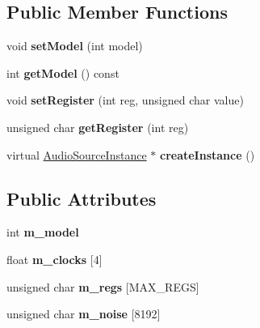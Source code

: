 \subsection*{Public Member Functions}
\begin{DoxyCompactItemize}
\item 
\mbox{\label{class_so_loud_1_1_vic_a0f50281a9b115fd11b81ee3eb700db79}} 
void {\bfseries set\+Model} (int model)
\item 
\mbox{\label{class_so_loud_1_1_vic_ad2c81766e3858af1800de741002ae928}} 
int {\bfseries get\+Model} () const
\item 
\mbox{\label{class_so_loud_1_1_vic_a7ffc185753800ed704512197ad5154e2}} 
void {\bfseries set\+Register} (int reg, unsigned char value)
\item 
\mbox{\label{class_so_loud_1_1_vic_a2cd7505d03ebeefd830d3e059989431c}} 
unsigned char {\bfseries get\+Register} (int reg)
\item 
\mbox{\label{class_so_loud_1_1_vic_afab138bb8248fabecd1c2cc7890935e4}} 
virtual \mbox{\hyperlink{class_so_loud_1_1_audio_source_instance}{Audio\+Source\+Instance}} $\ast$ {\bfseries create\+Instance} ()
\end{DoxyCompactItemize}
\subsection*{Public Attributes}
\begin{DoxyCompactItemize}
\item 
\mbox{\label{class_so_loud_1_1_vic_ac00b13becacb0784d820514373c46353}} 
int {\bfseries m\+\_\+model}
\item 
\mbox{\label{class_so_loud_1_1_vic_aed9212ea6caf3f4371aa0a64004e6efb}} 
float {\bfseries m\+\_\+clocks} \mbox{[}4\mbox{]}
\item 
\mbox{\label{class_so_loud_1_1_vic_aa5705e69527bd7f7ac496c4176db3a95}} 
unsigned char {\bfseries m\+\_\+regs} \mbox{[}M\+A\+X\+\_\+\+R\+E\+GS\mbox{]}
\item 
\mbox{\label{class_so_loud_1_1_vic_af2b4831dcb666069a29a91d5cebdb362}} 
unsigned char {\bfseries m\+\_\+noise} \mbox{[}8192\mbox{]}
\end{DoxyCompactItemize}


